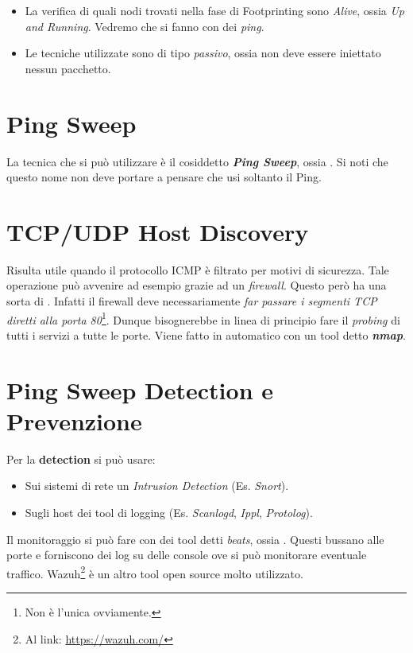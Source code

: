 \documentclass[14pt]{extreport}
\begin{document}
\begin{itemize}
    \item La verifica di quali nodi trovati nella fase di Footprinting sono \textit{Alive}, ossia \textit{Up and Running}. Vedremo che si fanno con dei \textit{ping}.
    \item Le tecniche utilizzate sono di tipo \textit{passivo}, ossia non deve essere iniettato nessun pacchetto.
\end{itemize}

\section{Ping Sweep}
La tecnica che si può utilizzare è il cosiddetto \textit{\textbf{Ping Sweep}}, ossia . Si noti che questo nome non deve portare a pensare che usi soltanto il Ping.

\section{TCP/UDP Host Discovery}
Risulta utile quando il protocollo ICMP è filtrato per motivi di sicurezza. Tale operazione può avvenire ad esempio grazie ad un \textit{firewall}.
Questo però ha una sorta di . Infatti il firewall deve necessariamente \textit{far passare i segmenti TCP diretti alla porta 80}\footnote{Non è l'unica ovviamente.}.
Dunque bisognerebbe in linea di principio fare il \textit{probing} di tutti i servizi a tutte le porte. Viene fatto in automatico con un tool detto \textit{\textbf{nmap}}.


\section{Ping Sweep Detection e Prevenzione}
Per la \textbf{detection} si può usare:

\begin{itemize}
    \item Sui sistemi di rete un \textit{Intrusion Detection} (Es. \textit{Snort}).
    \item Sugli host dei tool di logging (Es. \textit{Scanlogd}, \textit{Ippl}, \textit{Protolog}).
\end{itemize}

Il monitoraggio si può fare con dei tool detti \textit{beats}, ossia . Questi bussano alle porte e forniscono dei log su delle console ove si può monitorare eventuale traffico.
Wazuh\footnote{Al link: \url{https://wazuh.com/}} è un altro tool open source molto utilizzato.
\end{document}
